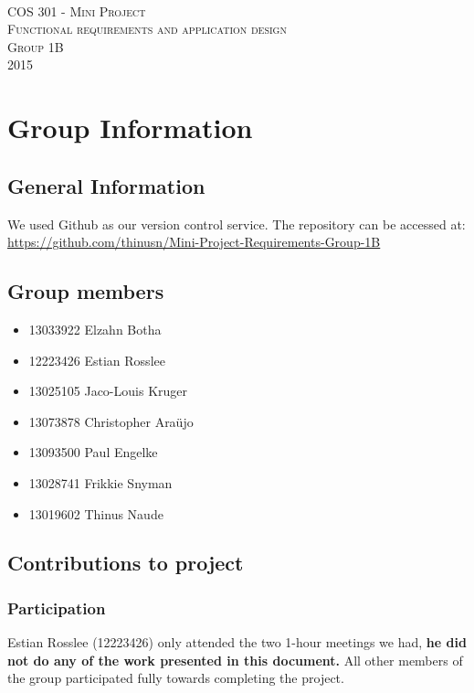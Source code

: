 \documentclass [a4paper,12pt] {article}
\begin{document}
\begin{titlepage}
	\begin{center}
		\textsc{\huge\\[5cm] COS 301 - Mini Project}\\[1cm]
		\textsc{\huge Functional requirements and application design}\\[1cm]
		\textsc{\huge Group 1B}\\[1cm]
		\textsc{\large 2015}
	\end{center}
\end{titlepage}
\tableofcontents
\pagebreak
\section{Group Information}
	\subsection{General Information}
	We used Github as our version control service. The repository can be accessed at: \linebreak \url{https://github.com/thinusn/Mini-Project-Requirements-Group-1B}
	\subsection{Group members}
	\begin{itemize}
		\item 13033922 Elzahn Botha
		\item 12223426 Estian Rosslee
		\item 13025105 Jaco-Louis Kruger
		\item 13073878 Christopher Araüjo
		\item 13093500 Paul Engelke
		\item 13028741 Frikkie Snyman
		\item 13019602 Thinus Naude
	\end{itemize}
	\subsection{Contributions to project}
		\subsubsection{Participation}
		Estian Rosslee (12223426) only attended the two 1-hour meetings we had, \textbf{he did not do any of the work presented in this document.} All other members of the group participated fully towards completing the project.
\end{document}
